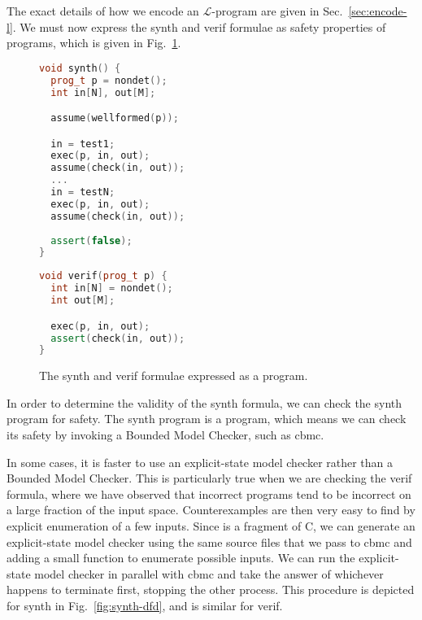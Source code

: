 The exact details of how we encode an $\mathcal{L}$-program are given in Sec.~\ref{sec:encode-l}.
We must now express the {\sc synth} and {\sc verif} formulae as safety properties
of \newC programs, which is given in Fig.~\ref{fig:c-synthverif}.

\begin{figure}
\centering
\begin{minipage}[t]{.45\textwidth}
\begin{lstlisting}[language=C++]
void synth() {
  prog_t p = nondet();
  int in[N], out[M];

  assume(wellformed(p));

  in = test1;
  exec(p, in, out);
  assume(check(in, out));
  ...
  in = testN;
  exec(p, in, out);
  assume(check(in, out));
  
  assert(false);
}
\end{lstlisting}
\begin{lstlisting}[language=C++]
void verif(prog_t p) {
  int in[N] = nondet();
  int out[M];

  exec(p, in, out);
  assert(check(in, out));
}
\end{lstlisting}
\end{minipage}

 \caption{The {\sc synth} and {\sc verif} formulae expressed as a \newC program.}
 \label{fig:c-synthverif}
\end{figure}

In order to determine the validity of the {\sc synth} formula, we can
check the {\sc synth} program for safety.  The {\sc synth} program is a
\newC program, which means we can check its safety by invoking a Bounded
Model Checker, such as {\sc cbmc}.

In some cases, it is faster to use an explicit-state model checker rather
than a Bounded Model Checker.  This is particularly true when we are checking
the {\sc verif} formula, where we have observed that incorrect programs tend
to be incorrect on a large fraction of the input space.  Counterexamples
are then very easy to find by explicit enumeration of a few inputs.
Since \newC is a fragment of C, we can generate an explicit-state
model checker using the same source files that we pass to {\sc cbmc}
and adding a small function to enumerate possible inputs.
We can run the explicit-state model checker
in parallel with {\sc cbmc} and take the answer of whichever happens
to terminate first, stopping the other process.  This procedure is
depicted for {\sc synth} in Fig.~\ref{fig:synth-dfd}, and is similar for {\sc verif}.

